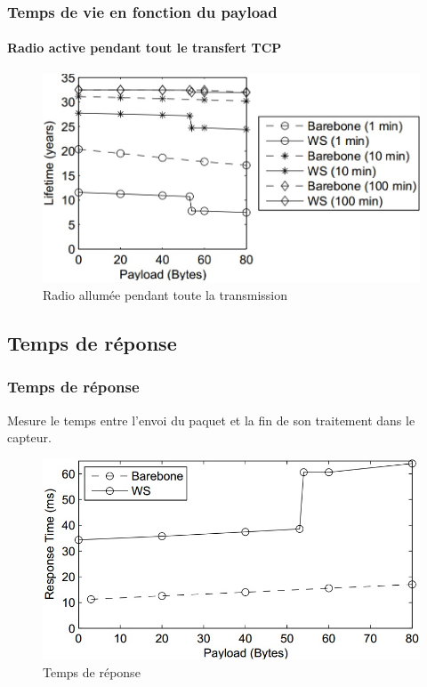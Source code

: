 \begin{frame}
 \frametitle{Temps de vie en fonction du payload}
 \framesubtitle{Radio active pendant tout le transfert TCP}
 \begin{figure}
  \centering
  \includegraphics[scale=\radiosca]{figures/radioon.jpg}
  \caption{Radio allumée pendant toute la transmission}
 \end{figure} 
\end{frame}


\subsection{Temps de réponse}
\begin{frame}
 \frametitle{Temps de réponse}
 Mesure le temps entre l'envoi du paquet et la fin de son traitement dans le capteur.
 \begin{figure}
  \centering
  \includegraphics[scale=0.35]{figures/treponse.jpg}
  \caption{Temps de réponse}
 \end{figure} 
\end{frame}
 
